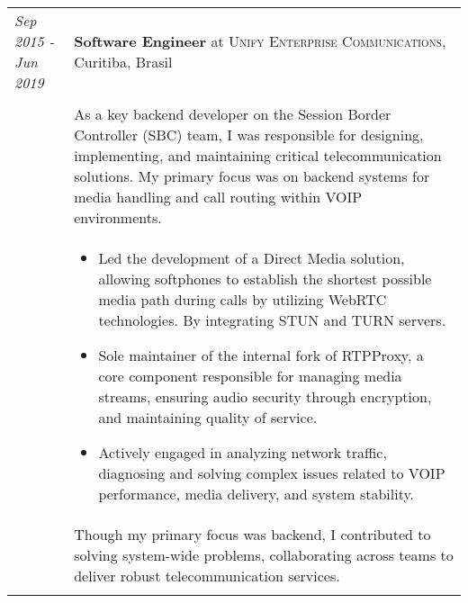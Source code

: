 \documentclass[a4paper,10pt]{article}
\begin{document}
    \begin{tabular}{@{} p{2.8cm} | p{12.2cm} @{}}
        \emph{Sep 2015 - Jun 2019}
        &\textbf{Software Engineer} at \textsc
        {Unify Enterprise Communications}, Curitiba, Brasil \\ \\

        &\normalsize
        {
            As a key backend developer on the Session Border Controller
            (SBC) team, I was responsible for designing, implementing,
            and maintaining critical telecommunication solutions. My
            primary focus was on backend systems for media handling and
            call routing within VOIP environments.
        } \\
        & \begin{itemize}[leftmargin=*]
            \item Led the development of a Direct Media solution, allowing
                softphones to establish the shortest possible media path
                during calls by utilizing WebRTC technologies. By
                integrating STUN and TURN servers.

            \item Sole maintainer of the internal fork of RTPProxy, a core
                component responsible for managing media streams, ensuring
                audio security through encryption, and maintaining quality
                of service.

            \item Actively engaged in analyzing network traffic, diagnosing
                and solving complex issues related to VOIP performance,
                media delivery, and system stability.
        \end{itemize} \\
        &\normalsize
        {
            Though my primary focus was backend, I contributed to solving
            system-wide problems, collaborating across teams to deliver
            robust telecommunication services.
        } \\

        \multicolumn{2}{c}{}
    \end{tabular}
\end{document}
